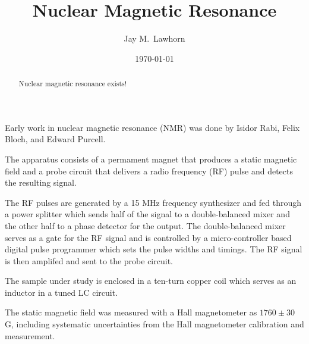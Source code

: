 \newcommand{\cd}{$\cdot$}

%
%


\title{Nuclear Magnetic Resonance}
\author{Jay M.\ Lawhorn}
\date{\today}

\begin{abstract}
Nuclear magnetic resonance exists!
\end{abstract}

\maketitle

Early work in nuclear magnetic resonance (NMR) was done by Isidor Rabi, Felix Bloch, and Edward Purcell.

The apparatus consists of a permament magnet that produces a static magnetic field and a probe circuit that delivers a radio frequency (RF) pulse and detects the resulting signal. 

The RF pulses are generated by a 15 MHz frequency synthesizer and fed through a power splitter which sends half of the signal to a double-balanced mixer and the other half to a phase detector for the output. The double-balanced mixer serves as a gate for the RF signal and is controlled by a micro-controller based digital pulse programmer which sets the pulse widths and timings. The RF signal is then amplifed and sent to the probe circuit. 

The sample under study is enclosed in a ten-turn copper coil which serves as an inductor in a tuned LC circuit.

The static magnetic field was measured with a Hall magnetometer as $1760\pm30$ G, including systematic uncertainties from the Hall magnetometer calibration and measurement.




